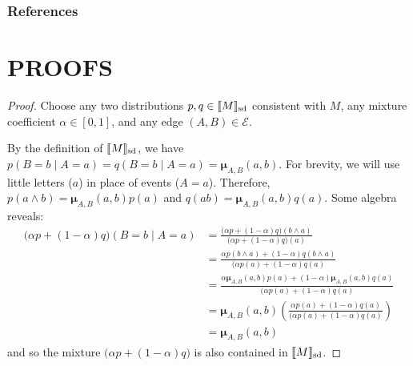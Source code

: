 \documentclass{article}
\DeclarePairedDelimiter{\SD}{\llbracket}{\rrbracket_{\text{sd}}}
\newcommand{\bmu}{\boldsymbol{\mu}}
\newcommand{\Ed}{\mathcal E}
\numberwithin{equation}{section}
\begin{document}
	\subsubsection*{References}
	\printbibliography[heading=none]
	
	\onecolumn
	\appendix
	
	\section{PROOFS}
\begin{vfull}
		\thmsetconvex*
		\begin{proof}
			Choose any two distributions $p, q \in \SD{M}$ consistent with $M$, any mixture coefficient $\alpha \in [0,1]$, and any edge $(A,B) \in \Ed$.
			
			By the definition of $\SD{M}$, we have $p(B = b \mid A = a) = q(B = b \mid A = a) = \bmu_{A,B}(a,b)$.  
			For brevity, we will use little letters ($a$) in place of events ($A = a$).
			Therefore, $p(a\land b) = \bmu_{A,B}(a,b) p(a)$ and $q(ab) = \bmu_{A,B}(a,b) q(a)$. Some algebra reveals:
			\begin{align*}
				\Big( \alpha p + (1-\alpha) q \Big) (B = b \mid A = a) &= 
				\frac{\Big( \alpha p + (1-\alpha) q \Big) (b \land a)}{\Big( \alpha p + (1-\alpha) q \Big) (a)} \\
				&= \frac{ \alpha p(b \land a) + (1-\alpha) q(b \land a) }{\Big( \alpha p(a) + (1-\alpha) q (a)} \\
				&= \frac{ \alpha \bmu_{A,B}(a,b) p(a) + (1-\alpha) \bmu_{A,B}(a,b) q(a) }{\Big( \alpha p(a) + (1-\alpha) q (a)} \\
				&=\bmu_{A,B}(a,b) \left(\frac{ \alpha  p(a) + (1-\alpha) q(a) }{\Big( \alpha p(a) + (1-\alpha) q (a)}\right)\\
				&= \bmu_{A,B}(a,b)
			\end{align*}
			and so the mixture $\Big(\alpha p + (1-\alpha) q \Big)$ is also contained in $\SD{M}$.
		\end{proof}
\end{vfull}
	
\end{document}
